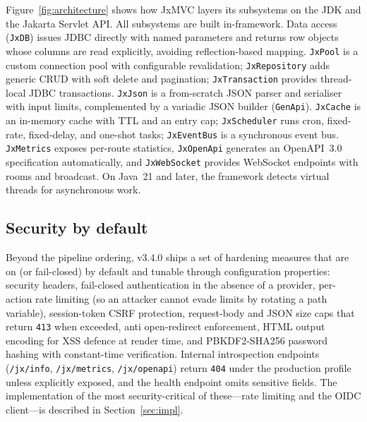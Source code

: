 Figure~\ref{fig:architecture} shows how JxMVC layers its subsystems on
the JDK and the Jakarta Servlet API. All subsystems are built
in-framework. Data access (\texttt{JxDB})
issues JDBC directly with named parameters and returns row objects
whose columns are read explicitly, avoiding reflection-based mapping.
\texttt{JxPool} is a custom connection pool with configurable
revalidation; \texttt{JxRepository} adds generic CRUD with soft delete
and pagination; \texttt{JxTransaction} provides thread-local JDBC
transactions. \texttt{JxJson} is a from-scratch JSON parser and
serialiser with input limits, complemented by a variadic JSON builder
(\texttt{GenApi}). \texttt{JxCache} is an in-memory cache with TTL and
an entry cap; \texttt{JxScheduler} runs cron, fixed-rate, fixed-delay,
and one-shot tasks; \texttt{JxEventBus} is a synchronous event bus.
\texttt{JxMetrics} exposes per-route statistics, \texttt{JxOpenApi}
generates an OpenAPI~3.0 specification automatically, and
\texttt{JxWebSocket} provides WebSocket endpoints with rooms and
broadcast. On Java~21 and later, the framework detects virtual threads
for asynchronous work.

\subsection{Security by default}

Beyond the pipeline ordering, v3.4.0 ships a set of hardening measures
that are on (or fail-closed) by default and tunable through
configuration properties: security headers, fail-closed authentication
in the absence of a provider, per-action rate limiting (so an attacker
cannot evade limits by rotating a path variable), session-token CSRF
protection, request-body and JSON size caps that return \texttt{413}
when exceeded, anti open-redirect enforcement, HTML output encoding for
XSS defence at render time, and PBKDF2-SHA256 password hashing with
constant-time verification. Internal introspection endpoints
(\texttt{/jx/info}, \texttt{/jx/metrics}, \texttt{/jx/openapi}) return
\texttt{404} under the production profile unless explicitly exposed,
and the health endpoint omits sensitive fields. The implementation of
the most security-critical of these---rate limiting and the OIDC
client---is described in Section~\ref{sec:impl}.
